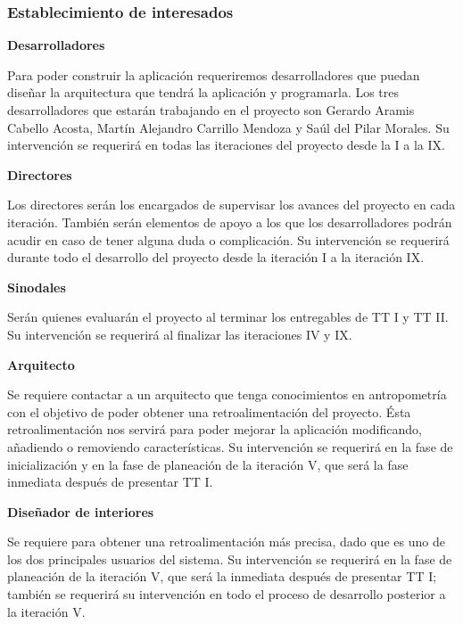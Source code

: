 \subsubsection{Establecimiento de interesados}
\textbf{Desarrolladores} \par
Para poder construir la aplicación requeriremos desarrolladores que puedan diseñar la arquitectura que tendrá la aplicación y programarla. Los tres desarrolladores que estarán trabajando en el proyecto son Gerardo Aramis Cabello Acosta, Martín Alejandro Carrillo Mendoza y Saúl del Pilar Morales. Su intervención se requerirá en todas las iteraciones del proyecto desde la I a la IX.\par
\textbf{Directores} \par
Los directores serán los encargados de supervisar los avances del proyecto en cada iteración. También serán elementos de apoyo a los que los desarrolladores podrán acudir en caso de tener alguna duda o complicación. Su intervención se requerirá durante todo el desarrollo del proyecto desde la iteración I a la iteración IX.\par
\textbf{Sinodales} \par
Serán quienes evaluarán el proyecto al terminar los entregables de TT I y TT II. Su intervención se requerirá al finalizar las iteraciones IV y IX.\par
\textbf{Arquitecto} \par
Se requiere contactar a un arquitecto que tenga conocimientos en antropometría con el objetivo de poder obtener una retroalimentación del proyecto. Ésta retroalimentación nos servirá para poder mejorar la aplicación modificando, añadiendo o removiendo características. Su intervención se requerirá en la fase de inicialización y en la fase de planeación de la iteración V, que será la fase inmediata después de presentar TT I.\par
\textbf{Diseñador de interiores} \par
Se requiere para obtener una retroalimentación más precisa, dado que es uno de los dos principales usuarios del sistema. Su intervención se requerirá en la fase de planeación de la iteración V, que será la inmediata después de presentar TT I; también se requerirá su intervención en todo el proceso de desarrollo posterior a la iteración V.\par

